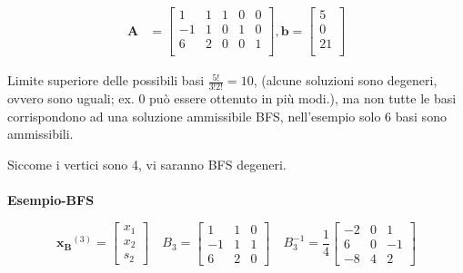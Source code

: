 \documentclass[a4paper, 11pt]{article}
\begin{document}
        \begin{align*}
            \mathbf{A} &= 
            \begin{bmatrix}
            1 & 1 & 1 & 0 & 0 \\
            -1 & 1 & 0 & 1 & 0 \\
            6 & 2 & 0 & 0 & 1 \\
            \end{bmatrix},
            \mathbf{b} = 
                \begin{bmatrix}
                    5 \\
                    0 \\
                    21 \\
                \end{bmatrix}
        \end{align*}

        Limite superiore delle possibili basi $\frac{5!}{3!2!} = 10$, (alcune soluzioni sono degeneri, ovvero sono uguali; ex. 0 può essere ottenuto in più modi.), ma non tutte le basi corrispondono ad una soluzione ammissibile BFS, nell’esempio solo 6 basi sono ammissibili.

        Siccome i vertici sono 4, vi saranno BFS degeneri.      
        
        \paragraph{}
        \textbf{Esempio-BFS}

        \[
            \mathbf{x_B}^{(3)} =
            \begin{bmatrix}
                x_1 \\ x_2 \\s_2
            \end{bmatrix}
            \quad
            B_3 =
            \begin{bmatrix}
                1 & 1 & 0 \\
                -1 & 1 & 1 \\
                6 & 2 & 0
            \end{bmatrix}
            \quad
            B_3^{-1} =
            \frac{1}{4}
            \begin{bmatrix}
                -2 & 0 & 1 \\
                6 & 0 & -1 \\
                -8 & 4 & 2
            \end{bmatrix}
        \]
            
\end{document}
